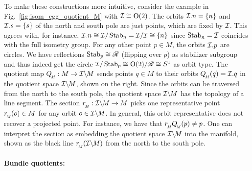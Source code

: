 To make these constructions more intuitive, consider the example in Fig.~\ref{fig:isom_egg_quotient_M} with $\mathcal{I} \cong \operatorname{O}(2)$.
The orbits $\mathcal{I}.n = \{n\}$ and $\mathcal{I}.s = \{s\}$ of the north and south pole are just points, which are fixed by $\mathcal{I}$.
This agrees with, for instance, $\mathcal{I}.n \cong \mathcal{I}/\operatorname{Stab}_{n} = \mathcal{I}/\mathcal{I} \cong \{n\}$ since $\operatorname{Stab}_{n}=\mathcal{I}$ coincides with the full isometry group.
For any other point $p\in M$, the orbits $\mathcal{I}.p$ are circles.
We have reflections $\operatorname{Stab}_{p} \cong \mathscr{R}$ (flipping over $p$) as stabilizer subgroup and thus indeed get the circle $\mathcal{I}/\operatorname{Stab}_{p} \cong \operatorname{O}(2)/\mathscr{R} \cong S^1$ as orbit type.
The quotient map $\QM:M\to\IM$ sends points $q\in M$ to their orbits $\QM(q) = \I.q$ in the quotient space $\mathcal{I}\backslash\mkern-1.5mu M$, shown on the right.
Since the orbits can be traversed from the north to the south pole, the quotient space $\mathcal{I}\backslash\mkern-1.5mu M$ has the topology of a line segment.
The section $\rM:\IM\to M$ picks one representative point $\rM(o) \in M$ for any orbit $o \in \mathcal{I}\backslash\mkern-1.5mu M$.
In general, this orbit representative does not recover a projected point.
For instance, we have that $\rM\QM(p) \neq p$.
One can interpret the section as embedding the quotient space $\mathcal{I}\backslash\mkern-1.5mu M$ into the manifold, shown as the black line $\rM(\IM)$ from the north to the south pole.





\paragraph{Bundle quotients:}


